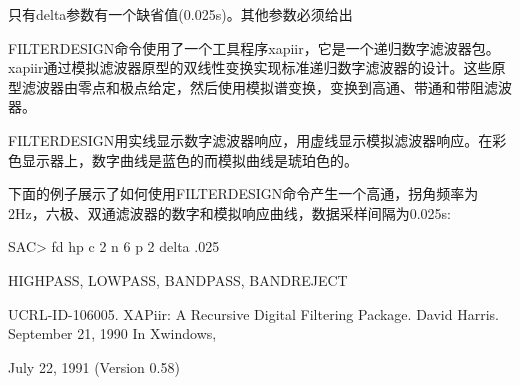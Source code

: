 只有delta参数有一个缺省值(0.025s)。其他参数必须给出

FILTERDESIGN命令使用了一个工具程序xapiir，它是一个递归数字滤波器包。xapiir通过模拟滤波器原型的双线性变换实现标准递归数字滤波器的设计。这些原型滤波器由零点和极点给定，然后使用模拟谱变换，变换到高通、带通和带阻滤波器。

FILTERDESIGN用实线显示数字滤波器响应，用虚线显示模拟滤波器响应。在彩色显示器上，数字曲线是蓝色的而模拟曲线是琥珀色的。

下面的例子展示了如何使用FILTERDESIGN命令产生一个高通，拐角频率为2Hz，六极、双通滤波器的数字和模拟响应曲线，数据采样间隔为0.025s:
\begin{SACCode}
SAC> fd hp c 2 n 6 p 2 delta .025
\end{SACCode}

HIGHPASS, LOWPASS, BANDPASS, BANDREJECT

UCRL-ID-106005. XAPiir: A Recursive Digital Filtering Package. David Harris.
September 21, 1990 In Xwindows,

July 22, 1991 (Version 0.58)
